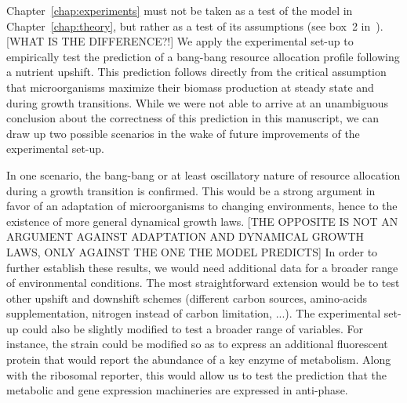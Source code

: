 Chapter~\ref{chap:experiments} must not be taken as a test of the model in Chapter~\ref{chap:theory}, but rather as a test of its assumptions (see box~2 in~\cite{servedio_not_2014}).  [WHAT IS THE DIFFERENCE?!]
We apply the experimental set-up to empirically test the prediction of a bang-bang resource allocation profile following a nutrient upshift.
This prediction follows directly from the critical assumption that microorganisms maximize their biomass production at steady state and during growth transitions.
While we were not able to arrive at an unambiguous conclusion about the correctness of this prediction in this manuscript, we can draw up two possible scenarios in the wake of future improvements of the experimental set-up.

In one scenario, the bang-bang or at least oscillatory nature of resource allocation during a growth transition is confirmed.
This would be a strong argument in favor of an adaptation of microorganisms to changing environments, hence to the existence of more general dynamical growth laws. [THE OPPOSITE IS NOT AN ARGUMENT AGAINST ADAPTATION AND DYNAMICAL GROWTH LAWS, ONLY AGAINST THE ONE THE MODEL PREDICTS]
In order to further establish these results, we would need additional data for a broader range of environmental conditions.
The most straightforward extension would be to test other upshift and downshift schemes (different carbon sources, amino-acids supplementation, nitrogen instead of carbon limitation, ...).
The experimental set-up could also be slightly modified to test a broader range of variables.
For instance, the strain could be modified so as to express an additional fluorescent protein that would report the abundance of a key enzyme of metabolism.
Along with the ribosomal reporter, this would allow us to test the prediction that the metabolic and gene expression machineries are expressed in anti-phase.

